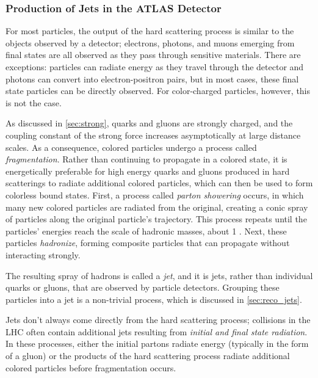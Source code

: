 \subsubsection{Production of Jets in the \ac{ATLAS} Detector}
\label{sec:pheno_jets}

For most particles, the output of the hard scattering process is similar to the objects observed by a detector; electrons, photons, and muons emerging from final states are all observed as they pass through sensitive materials. There are exceptions: particles can radiate energy as they travel through the detector and photons can convert into electron-positron pairs, but in most cases, these final state particles can be directly observed. For color-charged particles, however, this is not the case.

As discussed in \autoref{sec:strong}, quarks and gluons are strongly charged, and the coupling constant of the strong force increases a\-symptotically at large distance scales. As a consequence, colored particles undergo a process called \textit{fragmentation}. Rather than continuing to propagate in a colored state, it is energetically preferable for high energy quarks and gluons produced in hard scatterings to radiate additional colored particles, which can then be used to form colorless bound states. First, a process called \textit{parton showering} occurs, in which many new colored particles are radiated from the original, creating a conic spray of particles along the original particle's trajectory. This process repeats until the particles' energies reach the scale of hadronic masses, about 1 \gev. Next, these particles \textit{hadronize}, forming composite particles that can propagate without interacting strongly.     

The resulting spray of hadrons is called a \textit{jet}, and it is jets, rather than individual quarks or gluons, that are observed by particle detectors. Grouping these particles into a jet is a non-trivial process, which is discussed in \autoref{sec:reco_jets}.

Jets don't always come directly from the hard scattering process; collisions in the \ac{LHC} often contain additional jets resulting from \textit{initial and final state radiation}. In these processes, either the initial partons radiate energy (typically in the form of a gluon) or the products of the hard scattering process radiate additional colored particles before fragmentation occurs. 


